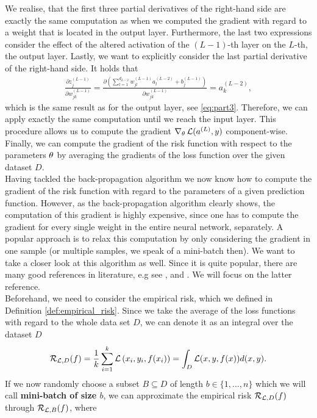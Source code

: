 We realise, that the first three partial derivatives of the right-hand side are exactly the same computation as when we computed the gradient with regard to a weight that is located in the output layer. Furthermore, the last two expressions consider the effect of the altered activation of the $(L-1)$-th layer on the $L$-th, the output layer. Lastly, we want to explicitly consider the last partial derivative of the right-hand side. It holds that
\begin{align*}
\frac{\partial z_j^{(L-1)}}{\partial w^{(L-1)}_{jk}} = \frac{\partial \left(\sum_{l=1}^{d_{L-2}} w_{jl}^{(L-1)}a_l^{(L-2)} + b_j^{(L-1)}\right)}{\partial w^{(L-1)}_{jk}} = a_k^{(L-2)},
\end{align*}
which is the same result as for the output layer, see \eqref{eq:part3}. Therefore, we can apply exactly the same computation until we reach the input layer. This procedure allows us to compute the gradient $\nabla_{\theta}\operatorname{\mathcal{L}}(a^{(L)}, y)$ component-wise. Finally, we can compute the gradient of the risk function with respect to the parameters $\theta$ by averaging the gradients of the loss function over the given dataset $D$.\\
Having tackled the back-propagation algorithm we now know how to compute the gradient of the risk function with regard to the parameters of a given prediction function. However, as the back-propagation algorithm clearly shows, the computation of this gradient is highly expensive, since one has to compute the gradient for every single weight in the entire neural network, separately. A popular approach is to relax this computation by only considering the gradient in one sample (or multiple samples, we speak of a mini-batch then). We want to take a closer look at this algorithm as well. Since it is quite popular, there are many good references in literature, e.g see \cite[Chapter~13.3.2]{sra2012optimization}, \cite[Chapter~4.2]{saad2009line} and \cite{turinici2021convergence}. We will focus on the latter reference.\\
Beforehand, we need to consider the empirical risk, which we defined in Definition \ref{def:empirical_risk}. Since we take the average of the loss functions with regard to the whole data set $D$, we can denote it as an integral over the dataset $D$
\begin{align*}
\operatorname{\mathcal{R}}_{\operatorname{\mathcal{L}}, D} (f) = \frac{1}{k} \sum_{i=1}^{k} \operatorname{\mathcal{L}}\left(x_i, y_i, f(x_i)\right) = \int_{D} \operatorname{\mathcal{L}}(x,y,f(x)) d(x,y).
\end{align*}
If we now randomly choose a subset $B \subseteq D$ of length $b\in\{1,\ldots,n\}$ which we will call \textbf{mini-batch of size $b$}, we can approximate the empirical risk $\operatorname{\mathcal{R}}_{\operatorname{\mathcal{L}}, D} (f)$ through $\operatorname{\mathcal{R}}_{\operatorname{\mathcal{L}}, B} (f)$, where
